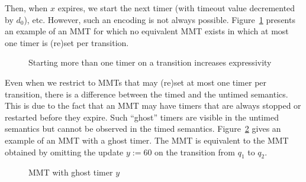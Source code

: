 Then, when $x$ expires, we start the next timer (with timeout value decremented by $d_0$), etc.
However, such an encoding is not always possible. 
Figure~\ref{fig:counterexample} presents an example of an MMT for which no equivalent MMT exists
in which at most one timer is (re)set per transition.
\begin{figure}
\begin{center}
\caption{Starting more than one timer on a transition increases expressivity}
\label{fig:counterexample}
\end{center}
\end{figure}

Even when we restrict to MMTs that may (re)set at most one timer per transition, there is a difference
between the timed and the untimed semantics.
This is due to the fact that an MMT may have timers that are always stopped or restarted before
they expire. Such ``ghost'' timers are visible in the untimed semantics but cannot be observed in the timed semantics.
Figure~\ref{fig:ghosttimers} gives an example of an MMT with a ghost timer. The MMT is equivalent to the MMT obtained by 
omitting the update $y :=60$ on the transition from $q_1$ to $q_2$.
\begin{figure}
\begin{center}
\caption{MMT with ghost timer $y$}
\label{fig:ghosttimers}
\end{center}
\end{figure}

